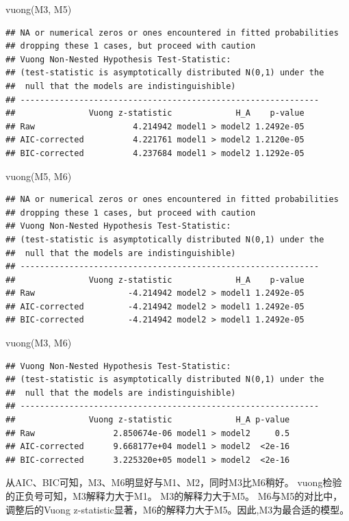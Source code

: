 \documentclass[
]{ctexart}
\newenvironment{Shaded}{\begin{snugshade}}{\end{snugshade}}
\newcommand{\FunctionTok}[1]{\textcolor[rgb]{0.00,0.00,0.00}{#1}}
\newcommand{\NormalTok}[1]{#1}
\begin{document}
\begin{Shaded}
\begin{Highlighting}[]
\FunctionTok{vuong}\NormalTok{(M3, M5)  }
\end{Highlighting}
\end{Shaded}

\begin{verbatim}
## NA or numerical zeros or ones encountered in fitted probabilities
## dropping these 1 cases, but proceed with caution
## Vuong Non-Nested Hypothesis Test-Statistic: 
## (test-statistic is asymptotically distributed N(0,1) under the
##  null that the models are indistinguishible)
## -------------------------------------------------------------
##               Vuong z-statistic             H_A    p-value
## Raw                    4.214942 model1 > model2 1.2492e-05
## AIC-corrected          4.221761 model1 > model2 1.2120e-05
## BIC-corrected          4.237684 model1 > model2 1.1292e-05
\end{verbatim}

\begin{Shaded}
\begin{Highlighting}[]
\FunctionTok{vuong}\NormalTok{(M5, M6)}
\end{Highlighting}
\end{Shaded}

\begin{verbatim}
## NA or numerical zeros or ones encountered in fitted probabilities
## dropping these 1 cases, but proceed with caution
## Vuong Non-Nested Hypothesis Test-Statistic: 
## (test-statistic is asymptotically distributed N(0,1) under the
##  null that the models are indistinguishible)
## -------------------------------------------------------------
##               Vuong z-statistic             H_A    p-value
## Raw                   -4.214942 model2 > model1 1.2492e-05
## AIC-corrected         -4.214942 model2 > model1 1.2492e-05
## BIC-corrected         -4.214942 model2 > model1 1.2492e-05
\end{verbatim}

\begin{Shaded}
\begin{Highlighting}[]
\FunctionTok{vuong}\NormalTok{(M3, M6)}
\end{Highlighting}
\end{Shaded}

\begin{verbatim}
## Vuong Non-Nested Hypothesis Test-Statistic: 
## (test-statistic is asymptotically distributed N(0,1) under the
##  null that the models are indistinguishible)
## -------------------------------------------------------------
##               Vuong z-statistic             H_A p-value
## Raw                2.850674e-06 model1 > model2     0.5
## AIC-corrected      9.668177e+04 model1 > model2  <2e-16
## BIC-corrected      3.225320e+05 model1 > model2  <2e-16
\end{verbatim}

从AIC、BIC可知，M3、M6明显好与M1、M2，同时M3比M6稍好。
vuong检验的正负号可知，M3解释力大于M1。 M3的解释力大于M5。
M6与M5的对比中，调整后的Vuong
z-statistic显著，M6的解释力大于M5。因此,M3为最合适的模型。
\end{document}
